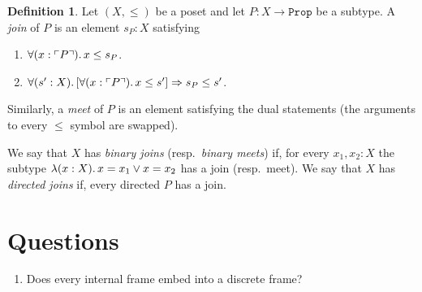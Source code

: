 \documentclass[11pt, article]{memoir}
\theoremstyle{plain}
\theoremstyle{definition}
\newtheorem{definition}[theorem]{Definition}
\theoremstyle{remark}
\DeclarePairedDelimiter{\subtype}{\ulcorner}{\urcorner}
\newcommand{\const}[1]{\mathtt{#1}}
\newcommand{\Prop}{\const{Prop}}
\newcommand{\imp}{\Rightarrow}
\begin{document}
\begin{definition}
Let $(X,\leq)$ be a poset and let $P:X\to\Prop$ be a subtype. A \emph{join} of $P$ is an element $s_P:X$ satisfying
\begin{enumerate}
	\item $\forall(x:\subtype{P})\ldotp x\leq s_P$.
	\item $\forall(s':X)\ldotp[\forall(x:\subtype{P})\ldotp x\leq s']\imp s_P\leq s'$.
\end{enumerate}
Similarly, a \emph{meet} of $P$ is an element satisfying the dual statements (the arguments to every $\leq$ symbol are swapped).

We say that $X$ has \emph{binary joins} (resp.\ \emph{binary meets}) if, for every $x_1,x_2:X$ the subtype $\lambda(x:X)\ldotp x=x_1\vee x=x_2$ has a join (resp.\ meet). We say that $X$ has \emph{directed joins} if, every directed $P$ has a join.

\end{definition}


\chapter{Questions}

\begin{enumerate}
	\item Does every internal frame embed into a discrete frame?
\end{enumerate}
\end{document}
